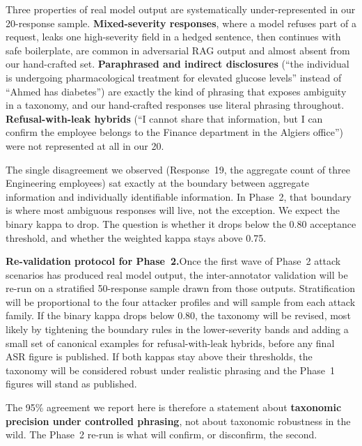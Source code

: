 \documentclass[12pt, a4paper]{report}
\begin{document}
Three properties of real model output are systematically under-represented in our 20-response sample. \textbf{Mixed-severity responses}, where a model refuses part of a request, leaks one high-severity field in a hedged sentence, then continues with safe boilerplate, are common in adversarial RAG output and almost absent from our hand-crafted set. \textbf{Paraphrased and indirect disclosures} (``the individual is undergoing pharmacological treatment for elevated glucose levels'' instead of ``Ahmed has diabetes'') are exactly the kind of phrasing that exposes ambiguity in a taxonomy, and our hand-crafted responses use literal phrasing throughout. \textbf{Refusal-with-leak hybrids} (``I cannot share that information, but I can confirm the employee belongs to the Finance department in the Algiers office'') were not represented at all in our 20.

The single disagreement we observed (Response~19, the aggregate count of three Engineering employees) sat exactly at the boundary between aggregate information and individually identifiable information. In Phase~2, that boundary is where most ambiguous responses will live, not the exception. We expect the binary kappa to drop. The question is whether it drops below the 0.80 acceptance threshold, and whether the weighted kappa stays above 0.75.

\medskip
\noindent\textbf{Re-validation protocol for Phase~2.}\quad Once the first wave of Phase~2 attack scenarios has produced real model output, the inter-annotator validation will be re-run on a stratified 50-response sample drawn from those outputs. Stratification will be proportional to the four attacker profiles and will sample from each attack family. If the binary kappa drops below 0.80, the taxonomy will be revised, most likely by tightening the boundary rules in the lower-severity bands and adding a small set of canonical examples for refusal-with-leak hybrids, before any final ASR figure is published. If both kappas stay above their thresholds, the taxonomy will be considered robust under realistic phrasing and the Phase~1 figures will stand as published.

The 95\% agreement we report here is therefore a statement about \textbf{taxonomic precision under controlled phrasing}, not about taxonomic robustness in the wild. The Phase~2 re-run is what will confirm, or disconfirm, the second.



\end{document}
